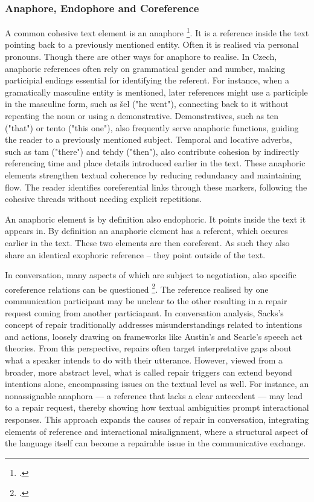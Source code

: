 \documentclass[12pt]{report}
\begin{document}
{\subsubsection{Anaphore, Endophore and Coreference}
\par
    A common cohesive text element is an anaphore \footcite{Nedoluzhko2010}.
    It is a reference inside the text pointing back to a previously mentioned entity.
    Often it is realised via personal pronouns.
    Though there are other ways for anaphore to realise.
    In Czech, anaphoric references often rely on grammatical gender and number,
    making participial endings essential for identifying the referent.
    For instance, when a gramatically masculine entity is mentioned,
    later references might use a participle in the masculine form, such as šel ("he went"),
    connecting back to it without repeating the noun or using a demonstrative.
    Demonstratives, such as ten ("that") or tento ("this one"),
    also frequently serve anaphoric functions, guiding the reader to a previously mentioned subject.
    Temporal and locative adverbs, such as tam ("there") and tehdy ("then"),
    also contribute cohesion by indirectly referencing time and place details introduced earlier in the text.
    These anaphoric elements strengthen textual coherence by reducing redundancy and maintaining flow.
    The reader identifies coreferential links through these markers,
    following the cohesive threads without needing explicit repetitions.

\par
    An anaphoric element is by definition also endophoric.
    It points inside the text it appears in.
    By definition an anaphoric element has a referent, which occures earlier in the text.
    These two elements are then coreferent.
    As such they also share an identical exophoric reference – they point outside of the text.

\par
    In conversation, many aspects of which are subject to negotiation,
    also specific coreference relations can be questioned \footcite{loaiciga2021reference}.
    The reference realised by one communication participant may be unclear to the other
    resulting in a repair request coming from another particiapant.
    In conversation analysis,
    Sacks’s concept of repair traditionally addresses
    misunderstandings related to intentions and actions,
    loosely drawing on frameworks like Austin’s and Searle’s speech act theories.
    From this perspective, repairs often target interpretative gaps about
    what a speaker intends to do with their utterance.
    However, viewed from a broader, more abstract level,
    what is called repair triggers can extend beyond intentions alone,
    encompassing issues on the textual level as well.
    For instance, an nonassignable anaphora —
    a reference that lacks a clear antecedent —
    may lead to a repair request,
    thereby showing how textual ambiguities prompt interactional responses.
    This approach expands the causes of repair in conversation,
    integrating elements of reference and interactional misalignment,
    where a structural aspect of the language itself can
    become a repairable issue in the communicative exchange.

}
\end{document}

